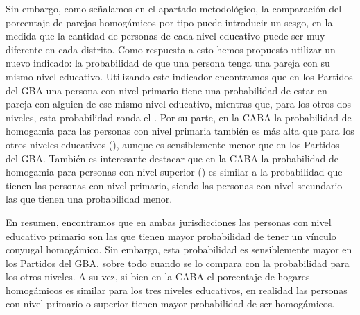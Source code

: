 \documentclass[
  spanish,
  a4paper,%
  chapterprefix=true,%
  DIV=calc,%
  twoside]{scrbook}%
\begin{document}
Sin embargo, como señalamos en el apartado metodológico, la comparación
del porcentaje de parejas homogámicos por tipo puede introducir un
sesgo, en la medida que la cantidad de personas de cada nivel educativo
puede ser muy diferente en cada distrito. Como respuesta a esto hemos
propuesto utilizar un nuevo indicado: la probabilidad de que una persona
tenga una pareja con su mismo nivel educativo. Utilizando este indicador
encontramos que en los Partidos del GBA una persona con nivel primario
tiene una probabilidad
 de estar en pareja
con alguien de ese mismo nivel educativo, mientras que, para los otros
dos niveles, esta probabilidad ronda el
. Por su parte, en la
CABA la probabilidad de homogamia para las personas con nivel primaria
también es más alta que para los otros niveles educativos
(), aunque es
sensiblemente menor que en los Partidos del GBA. También es interesante
destacar que en la CABA la probabilidad de homogamia para personas con
nivel superior () es
similar a la probabilidad que tienen las personas con nivel primario,
siendo las personas con nivel secundario las que tienen una probabilidad
menor.

En resumen, encontramos que en ambas jurisdicciones las personas con
nivel educativo primario son las que tienen mayor probabilidad de tener
un vínculo conyugal homogámico. Sin embargo, esta probabilidad es
sensiblemente mayor en los Partidos del GBA, sobre todo cuando se lo
compara con la probabilidad para los otros niveles. A su vez, si bien en
la CABA el porcentaje de hogares homogámicos es similar para los tres
niveles educativos, en realidad las personas con nivel primario o
superior tienen mayor probabilidad de ser homogámicos.
\end{document}

